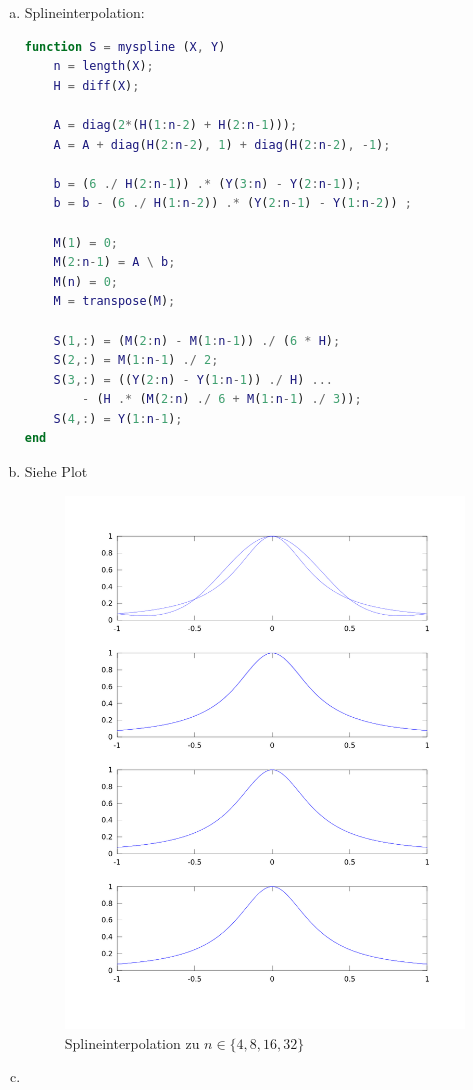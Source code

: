 \documentclass{mywork}
\begin{document}
\setcounter{aufgabe}{3}
\begin{aufgabe}
	\begin{enumerate}[a)]
		\item
			Splineinterpolation:
			\begin{lstlisting}[language=matlab,tabsize=4]
% Stephan Hilb, 2706616
function S = myspline (X, Y)
	n = length(X);
	H = diff(X);
	
	A = diag(2*(H(1:n-2) + H(2:n-1)));
	A = A + diag(H(2:n-2), 1) + diag(H(2:n-2), -1);

	b = (6 ./ H(2:n-1)) .* (Y(3:n) - Y(2:n-1));
	b = b - (6 ./ H(1:n-2)) .* (Y(2:n-1) - Y(1:n-2)) ;

	M(1) = 0;
	M(2:n-1) = A \ b;
	M(n) = 0;
	M = transpose(M);

	S(1,:) = (M(2:n) - M(1:n-1)) ./ (6 * H);
	S(2,:) = M(1:n-1) ./ 2;
	S(3,:) = ((Y(2:n) - Y(1:n-1)) ./ H) ...
		- (H .* (M(2:n) ./ 6 + M(1:n-1) ./ 3));
	S(4,:) = Y(1:n-1);
end
			\end{lstlisting}
		\item
			Siehe Plot
		\begin{figure}[h]
			\centering
			\caption{Splineinterpolation zu $n\in \{4,8,16,32\}$}
			\includegraphics[scale=0.5]{num1_5_4/num1_5_4.png}
		\end{figure}
		\item
			~


\end{enumerate}
\end{aufgabe}
\end{document}
